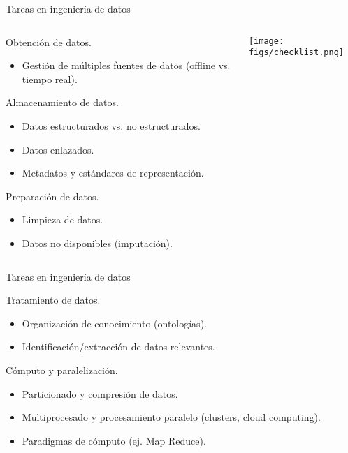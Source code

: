 \begin{frame}{Tareas en ingeniería de datos}
 \begin{columns}[T]
    \begin{column}{.8\textwidth}
  \begin{wideitemize}
  \item Obtención de datos.
  \begin{itemize}
   \item Gestión de múltiples fuentes de datos (offline vs. tiempo real).
  \end{itemize}

  \item Almacenamiento de datos.
  \begin{itemize}
   \item Datos estructurados vs. no estructurados.
   \item Datos enlazados.
   \item Metadatos y estándares de representación.
  \end{itemize}

  \item Preparación de datos.
  \begin{itemize}
   \item Limpieza de datos.
   \item Datos no disponibles (imputación).
  \end{itemize}
 \end{wideitemize}
    \end{column}
    \begin{column}{.20\textwidth}
    \vspace*{1.5cm}
    \texttt{[image: figs/checklist.png]}
    \end{column}
  \end{columns}
  
\end{frame}


\begin{frame}{Tareas en ingeniería de datos}
 \begin{wideitemize}
  \item Tratamiento de datos.
  \begin{itemize}
   \item Organización de conocimiento (ontologías).
   \item Identificación/extracción de datos relevantes.
  \end{itemize}

  \item Cómputo y paralelización.
  \begin{itemize}
   \item Particionado y compresión de datos.
   \item Multiprocesado y procesamiento paralelo (clusters, cloud computing).
   \item Paradigmas de cómputo (ej. Map Reduce).
  \end{itemize}
 \end{wideitemize}
 
\end{frame}

